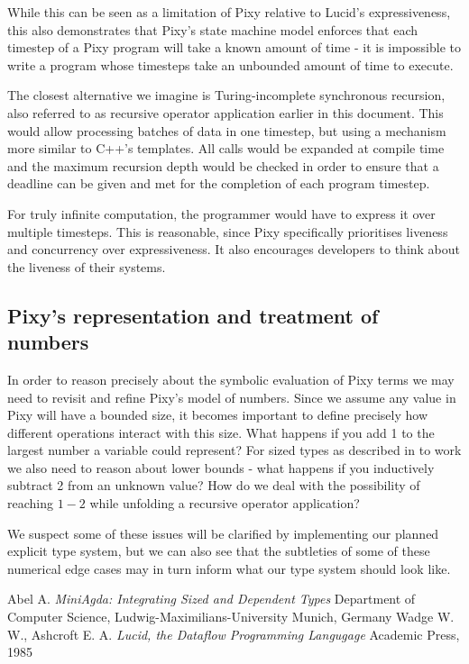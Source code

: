 \documentclass{scrartcl}
\begin{document}
    While this can be seen as a limitation of Pixy relative to Lucid's expressiveness, this also demonstrates that Pixy's state machine model enforces that each timestep of a Pixy program will take a known amount of time - it is impossible to write a program whose timesteps take an unbounded amount of time to execute.
    
    The closest alternative we imagine is Turing-incomplete synchronous recursion, also referred to as recursive operator application earlier in this document. This would allow processing batches of data in one timestep, but using a mechanism more similar to C++'s templates. All calls would be expanded at compile time and the maximum recursion depth would be checked in order to ensure that a deadline can be given and met for the completion of each program timestep.
    
    For truly infinite computation, the programmer would have to express it over multiple timesteps. This is reasonable, since Pixy specifically prioritises liveness and concurrency over expressiveness. It also encourages developers to think about the liveness of their systems.
    
    \subsection{Pixy's representation and treatment of numbers}
    
    In order to reason precisely about the symbolic evaluation of Pixy terms we may need to revisit and refine Pixy's model of numbers. Since we assume any value in Pixy will have a bounded size, it becomes important to define precisely how different operations interact with this size. What happens if you add 1 to the largest number a variable could represent? For sized types as described in \cite{abel} to work we also need to reason about lower bounds - what happens if you inductively subtract 2 from an unknown value? How do we deal with the possibility of reaching $1-2$ while unfolding a recursive operator application?
    
    We suspect some of these issues will be clarified by implementing our planned explicit type system, but we can also see that the subtleties of some of these numerical edge cases may in turn inform what our type system should look like.
    
    \begin{thebibliography}{9}
        Abel A.
        \textit{MiniAgda: Integrating Sized and Dependent Types}
        Department of Computer Science,
        Ludwig-Maximilians-University Munich, Germany
        Wadge W. W.,
        Ashcroft E. A.
        \textit{Lucid, the Dataflow Programming Langugage}
        Academic Press, 1985
    \end{thebibliography}
    
\end{document}
